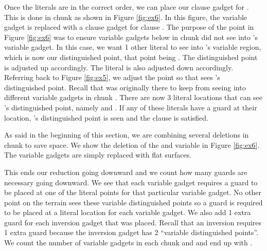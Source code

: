 \documentclass[11pt]{article}
\begin{document}
Once the literals are in the correct order, we can place our clause gadget for .  This is done in chunk  as shown in Figure \ref{fig:ex6}.  In this figure, the  variable gadget is replaced with a clause gadget for clause .  The purpose of the  point in Figure \ref{fig:ex6} was to ensure variable gadgets below  in chunk  did not see into 's variable gadget.  In this case, we want 1 other literal to see into 's variable region, which is now our  distinguished point, that point being .  The  distinguished point is adjusted up accordingly.  The literal  is also adjusted down accordingly.  Referring back to Figure \ref{fig:ex5}, we adjust the  point so that  sees 's distinguished point.  Recall that  was originally there to keep  from seeing into different variable gadgets in chunk .  There are now 3 literal locations that can see 's distinguished point, namely  and .  If any of these literals have a guard at their location, 's distinguished point is seen and the clause is satisfied.

As said in the beginning of this section, we are combining several deletions in chunk  to save space.  We show the deletion of the  and  variable in Figure \ref{fig:ex6}.  The variable gadgets are simply replaced with flat surfaces.

This ends our reduction going downward and we count how many guards are necessary going downward.  We see that each variable gadget requires a guard to be placed at one of the literal points for that particular variable gadget.  No other point on the terrain sees these variable distinguished points so a guard is required to be placed at a literal location for each variable gadget.  We also add 1 extra guard for each inversion gadget that was placed.  Recall that an inversion requires 1 extra guard because the inversion gadget has 2 ``variable distinguished points''.  We count the number of variable gadgets in each chunk  and  and end up with .
\end{document}
